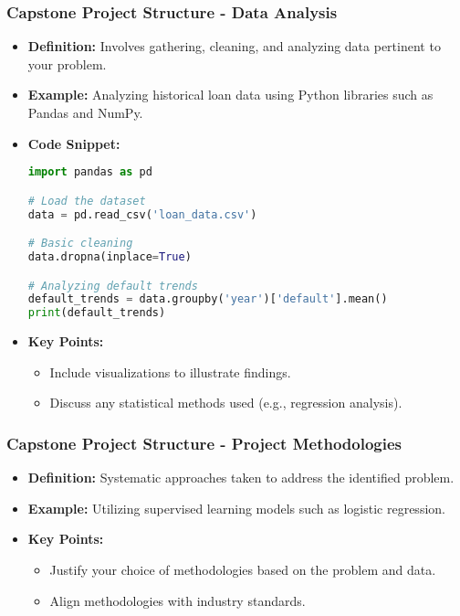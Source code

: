 \documentclass[aspectratio=169]{beamer}
\begin{document}
\begin{frame}[fragile]
  \frametitle{Capstone Project Structure - Data Analysis}
  \begin{itemize}
    \item \textbf{Definition:} Involves gathering, cleaning, and analyzing data pertinent to your problem.
    \item \textbf{Example:} Analyzing historical loan data using Python libraries such as Pandas and NumPy.
    \item \textbf{Code Snippet:}
    \begin{lstlisting}[language=Python]
import pandas as pd

# Load the dataset
data = pd.read_csv('loan_data.csv')

# Basic cleaning
data.dropna(inplace=True)

# Analyzing default trends
default_trends = data.groupby('year')['default'].mean()
print(default_trends)
    \end{lstlisting}
    \item \textbf{Key Points:}
      \begin{itemize}
        \item Include visualizations to illustrate findings.
        \item Discuss any statistical methods used (e.g., regression analysis).
      \end{itemize}
  \end{itemize}
\end{frame}

\begin{frame}[fragile]
  \frametitle{Capstone Project Structure - Project Methodologies}
  \begin{itemize}
    \item \textbf{Definition:} Systematic approaches taken to address the identified problem.
    \item \textbf{Example:} Utilizing supervised learning models such as logistic regression.
    \item \textbf{Key Points:}
      \begin{itemize}
        \item Justify your choice of methodologies based on the problem and data.
        \item Align methodologies with industry standards.
      \end{itemize}
  \end{itemize}
\end{frame}
\end{document}
